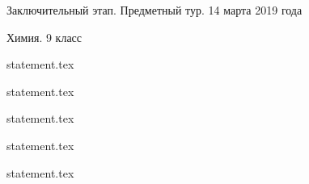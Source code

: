 \documentclass[a4paper,11pt, oneside]{book}
\begin{document}
\vspace{-3mm}
\vspace{-5mm}

\normalsize

\begin{center}
    Заключительный этап. Предметный тур. 14 марта 2019 года
    
    Химия. 9 класс
\end{center}

\parindent=0cm

{statement.tex}

{statement.tex}

{statement.tex}

\newpage

{statement.tex}

{statement.tex}
\end{document}
